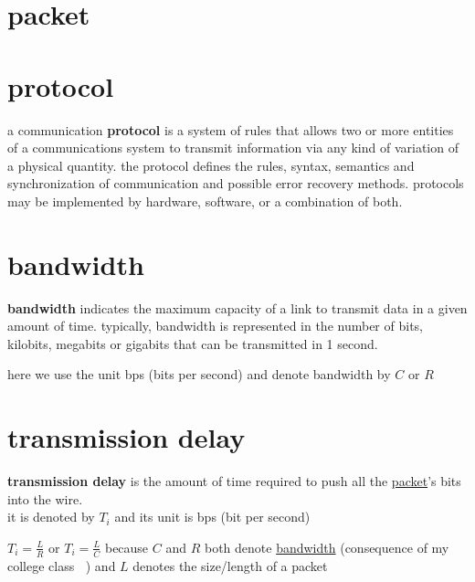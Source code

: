 \documentclass[a4paper,12pt]{article}
\begin{document}
\section{packet}
\label{sec:orgd4c2e7b}
\section{protocol}
\label{sec:org040283e}
\begin{definition}
a communication \textbf{protocol} is a system of rules that allows two or more entities of a communications system to transmit information via any kind of variation of a physical quantity. the protocol defines the rules, syntax, semantics and synchronization of communication and possible error recovery methods. protocols may be implemented by hardware, software, or a combination of both.\\
\end{definition}
\section{bandwidth}
\label{sec:org1cd0eee}
\begin{definition}
\textbf{bandwidth} indicates the maximum capacity of a link to transmit data in a given amount of time. typically, bandwidth is represented in the number of bits, kilobits, megabits or gigabits that can be transmitted in 1 second.\\
\begin{note}
here we use the unit bps (bits per second) and denote bandwidth by \(C\) or \(R\)\\
\end{note}
\end{definition}
\section{transmission delay}
\label{sec:org840ebaa}
\begin{definition}
\textbf{transmission delay} is the amount of time required to push all the \hyperref[sec:orgd4c2e7b]{packet}'s bits into the wire.\\
it is denoted by \(T_i\) and its unit is bps (bit per second)\\
\begin{lemma}
\(T_i = \frac{L}{R}\) or \(T_i = \frac{L}{C}\) because \(C\) and \(R\) both denote \hyperref[sec:org1cd0eee]{bandwidth} (consequence of my college class 🤷‍♂️) and \(L\) denotes the size/length of a packet\\
\end{lemma}
\end{definition}
\end{document}
